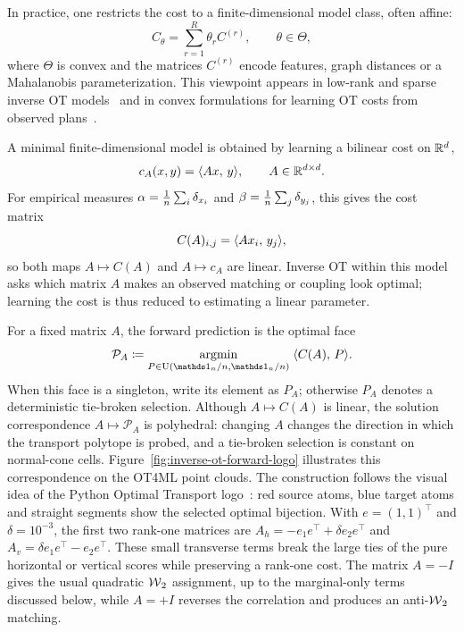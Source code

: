 In practice, one restricts the cost to a finite-dimensional model class, often affine:
\[
	C_\theta=\sum_{r=1}^R \theta_r C^{(r)},
	\qquad \theta\in\Theta,
\]
where $\Theta$ is convex and the matrices $C^{(r)}$ encode features, graph distances or a Mahalanobis parameterization. This viewpoint appears in low-rank and sparse inverse OT models~\cite{dupuy2016estimating,andrade2024sparsistency} and in convex formulations for learning OT costs from observed plans~\cite{ma2020learning,peyre2026curvature}.

A minimal finite-dimensional model is obtained by learning a bilinear cost on $\mathbb{R}^d$,
\[
	c_A(x,y)=\langle Ax,\,y\rangle,
	\qquad A\in\mathbb{R}^{d\times d}.
\]
For empirical measures $\alpha=\frac1n\sum_i\delta_{x_i}$ and $\beta=\frac1n\sum_j\delta_{y_j}$, this gives the cost matrix
\[
	C(A)_{i,j}=\langle Ax_i,\,y_j\rangle,
\]
so both maps $A\mapsto C(A)$ and $A\mapsto c_A$ are linear. Inverse OT within this model asks which matrix $A$ makes an observed matching or coupling look optimal; learning the cost is thus reduced to estimating a linear parameter.

For a fixed matrix $A$, the forward prediction is the optimal face
\[
	\mathcal P_A\eqdef
	\uargmin{P\in\CouplingsD(\ones_n/n,\ones_n/n)}
	\dotp{C(A)}{P}.
\]
When this face is a singleton, write its element as $P_A$; otherwise $P_A$ denotes a deterministic tie-broken selection. Although $A\mapsto C(A)$ is linear, the solution correspondence $A\mapsto\mathcal P_A$ is polyhedral: changing $A$ changes the direction in which the transport polytope is probed, and a tie-broken selection is constant on normal-cone cells. Figure~\ref{fig:inverse-ot-forward-logo} illustrates this correspondence on the OT4ML point clouds. The construction follows the visual idea of the Python Optimal Transport logo~\cite{flamary2021pot}: red source atoms, blue target atoms and straight segments show the selected optimal bijection. With $e=(1,1)^\top$ and $\delta=10^{-3}$, the first two rank-one matrices are $A_h=-e_1e^\top+\delta e_2e^\top$ and $A_v=\delta e_1e^\top-e_2e^\top$. These small transverse terms break the large ties of the pure horizontal or vertical scores while preserving a rank-one cost. The matrix $A=-I$ gives the usual quadratic $\operatorname{\mathcal{W}}_2$ assignment, up to the marginal-only terms discussed below, while $A=+I$ reverses the correlation and produces an anti-$\operatorname{\mathcal{W}}_2$ matching.

